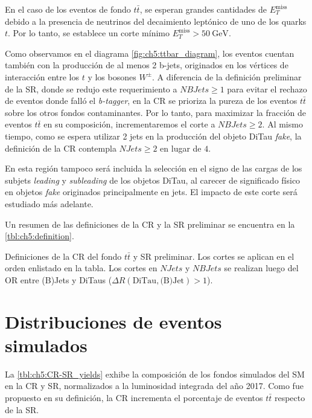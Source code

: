 En el caso de los eventos de fondo $t\bar{t}$, se esperan grandes cantidades de $E_T^{\text{miss}}$ debido a la presencia de neutrinos del decaimiento leptónico de uno de los quarks $t$. Por lo tanto, se establece un corte mínimo $E_T^{\text{miss}} > \SI{50}{\GeV}$.

Como observamos en el diagrama \ref{fig:ch5:ttbar_diagram}, los eventos cuentan también con la producción de al menos 2 b-jets, originados en los vértices de interacción entre los $t$ y los bosones $W^\pm$. A diferencia de la definición preliminar de la SR, donde se redujo este requerimiento a $NBJets \geq 1$ para evitar el rechazo de eventos donde falló el \textit{b-tagger}, en la CR se prioriza la pureza de los eventos $t\bar{t}$ sobre los otros fondos contaminantes. Por lo tanto, para maximizar la fracción de eventos $t\bar{t}$ en su composición, incrementaremos el corte a $NBJets \geq 2$. Al mismo tiempo, como se espera utilizar 2 jets en la producción del objeto DiTau \textit{fake}, la definición de la CR contempla $NJets \geq 2$ en lugar de $4$.

En esta región tampoco será incluida la selección en el signo de las cargas de los subjets \textit{leading} y \textit{subleading} de los objetos DiTau, al carecer de significado físico en objetos \textit{fake} originados principalmente en jets. El impacto de este corte será estudiado más adelante.

Un resumen de las definiciones de la CR y la SR preliminar se encuentra en la \cref{tbl:ch5:definition}.

\begin{table}[t]
    \centering
    \small
    
    \caption{Definiciones de la CR del fondo $t\bar{t}$ y SR preliminar. Los cortes se aplican en el orden enlistado en la tabla. Los cortes en $NJets$ y $NBJets$ se realizan luego del OR entre (B)Jets y DiTaus ($\Delta R(\text{DiTau}, \text{(B)Jet}) > 1$).}
    \label{tbl:ch5:definition}
\end{table}



\section{Distribuciones de eventos simulados}

La \cref{tbl:ch5:CR-SR_yields} exhibe la composición de los fondos simulados del SM en la CR y SR, normalizados a la luminosidad integrada del año 2017. Como fue propuesto en su definición, la CR incrementa el porcentaje de eventos $t\bar{t}$ respecto de la SR.

